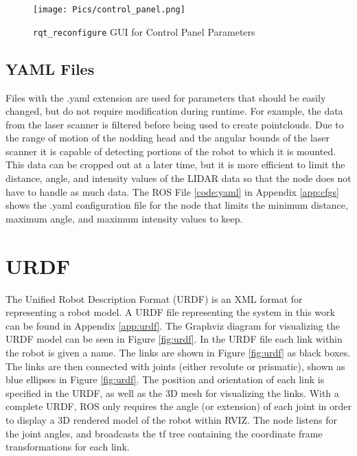 \begin{figure}[h]
    \centering
    \texttt{[image: Pics/control\_panel.png]}
    \caption{\texttt{rqt\_reconfigure} GUI for Control Panel Parameters}
    \label{fig:cpgui}
\end{figure}

\subsection{YAML Files}
Files with the .yaml extension are used for parameters that should be easily changed, but do not require modification during runtime. For example, the data from the laser scanner is filtered before being used to create pointclouds. Due to the range of motion of the nodding head and the angular bounds of the laser scanner it is capable of detecting portions of the robot to which it is mounted. This data can be cropped out at a later time, but it is more efficient to limit the distance, angle, and intensity values of the LIDAR data so that the  node does not have to handle as much data. The ROS File \ref{code:yaml} in Appendix \ref{app:cfgs} shows the .yaml configuration file for the  node that limits the minimum distance, maximum angle, and maximum intensity values to keep.\\

\section{URDF}
The Unified Robot Description Format (URDF) is an XML format for representing a robot model. A URDF file representing the system in this work can be found in Appendix \ref{app:urdf}. The Graphviz diagram for visualizing the URDF model can be seen in Figure \ref{fig:urdf}. In the URDF file each link within the robot is given a name. The links are shown in Figure \ref{fig:urdf} as black boxes. The links are then connected with joints (either revolute or prismatic), shown as blue ellipses in Figure \ref{fig:urdf}. The position and orientation of each link is specified in the URDF, as well as the 3D mesh for visualizing the links. With a complete URDF, ROS only requires the angle (or extension) of each joint in order to display a 3D rendered model of the robot within RVIZ. The  node listens for the joint angles, and broadcasts the tf tree containing the coordinate frame transformations for each link.\\


